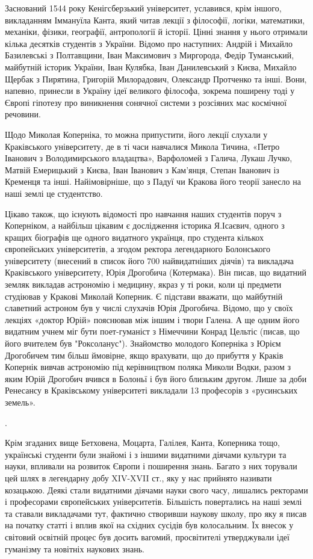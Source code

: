 Заснований 1544 року Кенігсберзький університет, уславився, крім іншого,
викладанням Іммануїла Канта, який читав лекції з філософії, логіки, математики,
механіки, фізики, географії, антропології й історії. Цінні знання у нього
отримали кілька десятків студентів з України. Відомо про наступних: Андрій і
Михайло Базилевські з Полтавщини, Іван Максимович з Миргорода, Федір
Туманський, майбутній історик України, Іван Кулябка, Іван Данилевський з Києва,
Михайло Щербак з Пирятина, Григорій Милорадович, Олександр Протченко та інші.
Вони, напевно, принесли в Україну ідеї великого філософа, зокрема поширену тоді
у Європі гіпотезу про виникнення сонячної системи з розсіяних мас космічної
речовини.

Щодо Миколая Коперніка, то можна припустити, його лекції слухали у Краківського
університету, де в ті часи навчалися Микола Тичина, «Петро Іванович з
Володимирського владацтва», Варфоломей з Галича, Лукаш Лучко, Матвій Емерицький
з Києва, Іван Іванович з Кам'янця, Степан Іванович із Кременця та інші.
Найімовірніше, що з Падуї чи Кракова його теорії занесло на наші землі це
студентство. 

Цікаво також, що існують відомості про навчання наших студентів поруч з
Коперніком, а найбільш цікавим є дослідження історика Я.Ісаєвич, одного з
кращих біографів ще одного видатного українця, про студента кількох
європейських університетів, а згодом ректора легендарного Болонського
університету (внесений в список його 700 найвидатніших діячів) та викладача
Краківського університету, Юрія Дрогобича (Котермака). Він писав, що видатний
земляк викладав астрономію і медицину, якраз у ті роки, коли ці предмети
студіював у Кракові Миколай Коперник. Є підстави вважати, що майбутній
славетний астроном був у числі слухачів Юрія Дрогобича. Відомо, що у своїх
лекціях «доктор Юрій» пояснював між іншим і твори Галена. А ще одним його
видатним учнем міг бути поет-гуманіст з Німеччини Конрад Цельтіс (писав, що
його вчителем був "Роксоланус"). Знайомство молодого Коперніка з Юрієм
Дрогобичем тим більш ймовірне, якщо врахувати, що до прибуття у Краків Копернік
вивчав астрономію під керівництвом поляка Миколи Водки, разом з яким Юрій
Дрогобич вчився в Болоньї і був його близьким другом. Лише за доби Ренесансу в
Краківському університеті викладали 13 професорів з «русинських земель». 

.

Крім згаданих вище Бетховена, Моцарта, Галілея, Канта, Коперника тощо,
українські студенти були знайомі і з іншими видатними діячами культури та
науки, впливали на розвиток Європи і поширення знань. Багато з них торували цей
шлях в легендарну добу XIV-XVII ст., яку у нас прийнято називати козацькою.
Деякі стали видатними діячами науки свого часу, лишались ректорами і
професорами європейських університетів. Більшість повертались на наші землі та
ставали викладачами тут, фактично створивши наукову школу, про яку я писав на
початку статті і вплив якої на східних сусідів був колосальним. Їх внесок у
світовий освітній процес був досить вагомий, просвітителі утверджували ідеї
гуманізму та новітніх наукових знань.

